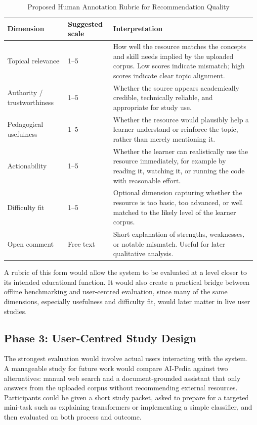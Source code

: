 \documentclass[10pt,journal,compsoc]{IEEEtran}
\begin{document}
\begin{table}[!t]
\renewcommand{\arraystretch}{1.2}
\caption{Proposed Human Annotation Rubric for Recommendation Quality}
\label{tab:annotation_rubric}
\centering
\footnotesize
\begin{tabular}{@{}p{2.3cm}p{2.1cm}p{8.6cm}@{}}
\hline\hline
Dimension & Suggested scale & Interpretation\\
\hline
Topical relevance & 1--5 & How well the resource matches the concepts and skill needs implied by the uploaded corpus. Low scores indicate mismatch; high scores indicate clear topic alignment.\\
Authority / trustworthiness & 1--5 & Whether the source appears academically credible, technically reliable, and appropriate for study use.\\
Pedagogical usefulness & 1--5 & Whether the resource would plausibly help a learner understand or reinforce the topic, rather than merely mentioning it.\\
Actionability & 1--5 & Whether the learner can realistically use the resource immediately, for example by reading it, watching it, or running the code with reasonable effort.\\
Difficulty fit & 1--5 & Optional dimension capturing whether the resource is too basic, too advanced, or well matched to the likely level of the learner corpus.\\
Open comment & Free text & Short explanation of strengths, weaknesses, or notable mismatch. Useful for later qualitative analysis.\\
\hline\hline
\end{tabular}
\end{table}

A rubric of this form would allow the system to be evaluated at a level closer to its intended educational function. It would also create a practical bridge between offline benchmarking and user-centred evaluation, since many of the same dimensions, especially usefulness and difficulty fit, would later matter in live user studies.

\subsection{Phase 3: User-Centred Study Design}

The strongest evaluation would involve actual users interacting with the system. A manageable study for future work would compare AI-Pedia against two alternatives: manual web search and a document-grounded assistant that only answers from the uploaded corpus without recommending external resources. Participants could be given a short study packet, asked to prepare for a targeted mini-task such as explaining transformers or implementing a simple classifier, and then evaluated on both process and outcome.
\end{document}
